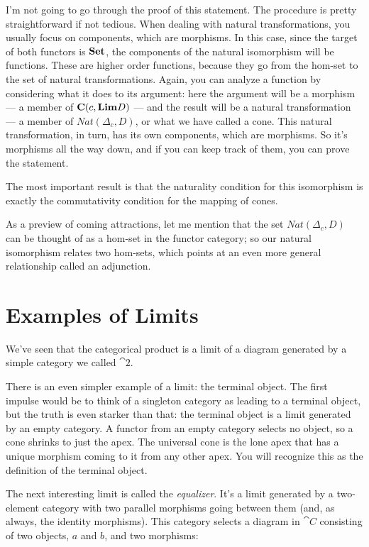 I'm not going to go through the proof of this statement. The procedure
is pretty straightforward if not tedious. When dealing with natural
transformations, you usually focus on components, which are morphisms.
In this case, since the target of both functors is $\Set$, the
components of the natural isomorphism will be functions. These are
higher order functions, because they go from the hom-set to the set of
natural transformations. Again, you can analyze a function by
considering what it does to its argument: here the argument will be a
morphism --- a member of $\cat{C}(c, \Lim[D])$ --- and the result will
be a natural transformation --- a member of $\mathit{Nat}(\Delta_c, D)$, or
what we have called a cone. This natural transformation, in turn, has
its own components, which are morphisms. So it's morphisms all the way
down, and if you can keep track of them, you can prove the statement.

The most important result is that the naturality condition for this
isomorphism is exactly the commutativity condition for the mapping of
cones.

As a preview of coming attractions, let me mention that the set
$\mathit{Nat}(\Delta_c, D)$ can be thought of as a hom-set in the functor
category; so our natural isomorphism relates two hom-sets, which points
at an even more general relationship called an adjunction.

\section{Examples of Limits}

We've seen that the categorical product is a limit of a diagram
generated by a simple category we called $\cat{2}$.

There is an even simpler example of a limit: the terminal object. The
first impulse would be to think of a singleton category as leading to a
terminal object, but the truth is even starker than that: the terminal
object is a limit generated by an empty category. A functor from an
empty category selects no object, so a cone shrinks to just the apex.
The universal cone is the lone apex that has a unique morphism coming to
it from any other apex. You will recognize this as the definition of the
terminal object.

The next interesting limit is called the \emph{equalizer}. It's a limit
generated by a two-element category with two parallel morphisms going
between them (and, as always, the identity morphisms). This category
selects a diagram in $\cat{C}$ consisting of two objects, $a$ and
$b$, and two morphisms:

